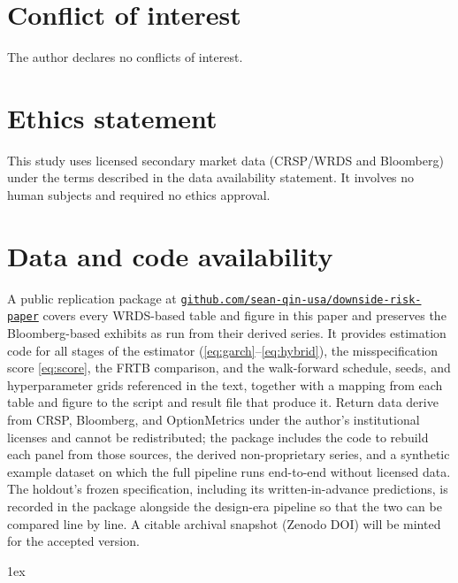 \documentclass[11pt]{article}
\theoremstyle{remark}
\begin{document}
\section*{Conflict of interest}
The author declares no conflicts of interest.

\section*{Ethics statement}
This study uses licensed secondary market data (CRSP/WRDS and
Bloomberg) under the terms described in the data availability
statement. It involves no human subjects and required no ethics
approval.

\section*{Data and code availability}
A public replication package at
\href{https://github.com/sean-qin-usa/downside-risk-paper}{\texttt{github.com/sean-qin-usa/downside-risk-paper}}
covers every WRDS-based table and figure in this paper and preserves
the Bloomberg-based exhibits as run from their derived series. It
provides estimation code for all stages of the estimator
(\eqref{eq:garch}--\eqref{eq:hybrid}), the misspecification score
\eqref{eq:score}, the FRTB comparison, and the walk-forward schedule, seeds, and hyperparameter grids
referenced in the text, together with a mapping from each table and
figure to the script and result file that produce it. Return data
derive from CRSP, Bloomberg, and OptionMetrics under the author's
institutional licenses and cannot be redistributed; the package
includes the code to rebuild each panel from those sources, the derived
non-proprietary series, and a synthetic example dataset on which the
full pipeline runs end-to-end without licensed data. The holdout's
frozen specification, including its written-in-advance predictions, is
recorded in the package alongside the design-era pipeline so that the
two can be compared line by line. A citable archival snapshot (Zenodo
DOI) will be minted for the accepted version.

\begingroup
\parindent 0pt\parskip 1ex
\renewcommand{\enotesize}{\normalsize}
\theendnotes
\endgroup




\end{document}
